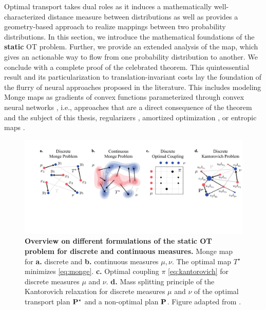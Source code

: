  Optimal transport takes dual roles as it induces a mathematically well-characterized distance measure between distributions as well as provides a geometry-based approach to realize mappings between two probability distributions.
In this section, we introduce the mathematical foundations of the \textbf{static} OT problem. Further, we provide an extended analysis of the \citeauthor{monge1781histoire} map, which gives an actionable way to flow from one probability distribution to another.
We conclude with a complete proof of the celebrated \citeauthor{brenier1987decomposition} theorem. This quintessential result and its particularization to translation-invariant costs lay the foundation of the flurry of neural approaches proposed in the literature. This includes modeling Monge maps as gradients of convex functions parameterized through convex neural networks \citep{amos2017input, huang2021convex, makkuva2020optimal, korotin2021neural, lubeck2022neural, bunne2022supervised}, i.e., approaches that are a direct consequence of the \citeauthor{brenier1987decomposition} theorem and the subject of this thesis, regularizers \citep{uscidda2023monge}, amortized optimization \citep{amos2023amortizing, amos2023meta}, or entropic maps \citep{pooladian2021entropic, pooladian2023minimax, divol2022optimal, cuturi2023monge}.

\begin{figure}[t]
  \includegraphics[width=\textwidth]{figures/fig_ot_background.pdf}
  \caption{\textbf{Overview on different formulations of the static OT problem for discrete and continuous measures.} Monge map for \textbf{a.} discrete and \textbf{b.} continuous measures $\mu, \nu$. The optimal map $T^\star$ minimizes \eqref{eq:monge}. \textbf{c.} Optimal coupling $\pi$ \eqref{eq:kantorovich} for discrete measures $\mu$ and $\nu$. \textbf{d.} Mass splitting principle of the Kantorovich relaxation for discrete measures $\mu$ and $\nu$ of the optimal transport plan $\mathbf{P}^\star$ and a non-optimal plan $\mathbf{P}$. Figure adapted from \citet{peyre2019computational}.}	
  \label{fig:ot_principles}
\end{figure}

